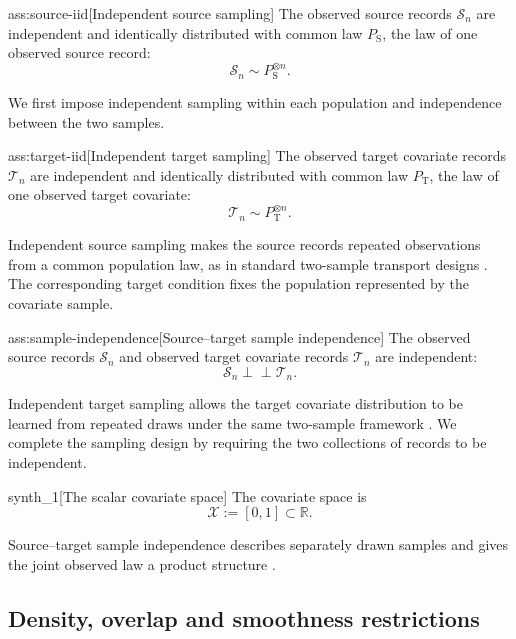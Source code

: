 \documentclass[11pt]{article}
\begin{document}
\begin{assumptionv}{ass:source-iid}[Independent source sampling]
The observed source records \(\mathcal S_n\) are independent and identically distributed with common law \(P_{\mathrm S}\), the law of one observed source record:
\[
\mathcal S_n\sim P_{\mathrm S}^{\otimes n}.
\]
\end{assumptionv}

We first impose independent sampling within each population and independence between the two samples.

\begin{assumptionv}{ass:target-iid}[Independent target sampling]
The observed target covariate records \(\mathcal T_n\) are independent and identically distributed with common law \(P_{\mathrm T}\), the law of one observed target covariate:
\[
\mathcal T_n\sim P_{\mathrm T}^{\otimes n}.
\]
\end{assumptionv}

Independent source sampling makes the source records repeated observations from a common population law, as in standard two-sample transport designs \citep{ZengKennedyBodnarNaimi2025Efficient}. The corresponding target condition fixes the population represented by the covariate sample.

\begin{assumptionv}{ass:sample-independence}[Source–target sample independence]
The observed source records \(\mathcal S_n\) and observed target covariate records \(\mathcal T_n\) are independent:
\[
\mathcal S_n\perp\!\!\!\perp\mathcal T_n.
\]
\end{assumptionv}

Independent target sampling allows the target covariate distribution to be learned from repeated draws under the same two-sample framework \citep{ZengKennedyBodnarNaimi2025Efficient}. We complete the sampling design by requiring the two collections of records to be independent.

\begin{definitionv}{synth_1}[The scalar covariate space]
The covariate space is
\[
\mathcal X := [0,1] \subset \mathbb R.
\]
\end{definitionv}

Source–target sample independence describes separately drawn samples and gives the joint observed law a product structure \citep{ZengKennedyBodnarNaimi2025Efficient}.

\subsection{Density, overlap and smoothness restrictions}
\end{document}
